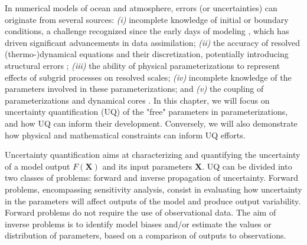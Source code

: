 \documentclass[draft]{agujournal2019}
\begin{document}
In numerical models of ocean and atmosphere, errors  (or uncertainties) can originate from several sources: \textit{(i)} incomplete knowledge of initial or boundary conditions, a challenge recognized since the early days of modeling \cite{charney_dynamic_1951,lorenz_deterministic_1963}, which has driven significant advancements in data assimilation; \textit{(ii)} the accuracy of resolved (thermo-)dynamical equations and their discretization, potentially introducing structural errors \cite{lauritzen_reconciling_2022,fox-kemper_challenges_2019,mesinger_numerical_2018,klingbeil_numerics_2018}; \textit{(iii)} the ability of physical parameterizations to represent effects of subgrid processes on resolved scales; \textit{(iv)} incomplete knowledge of the parameters involved in these parameterizations; and \textit{(v)} the coupling of parameterizations and dynamical cores \cite{gross_physics_2018}. In this chapter, we will focus on uncertainty quantification (UQ) of the "free" parameters in parameterizations, and how UQ can inform their development. Conversely, we will also demonstrate how physical and mathematical constraints can inform UQ efforts. 
\par Uncertainty quantification aims at characterizing and quantifying the uncertainty of a model output $F(\bm X)$ and its input parameters $\bm X$. UQ can be divided into two classes of problems: forward and inverse propagation of uncertainty. Forward problems, encompassing sensitivity analysis, consist in evaluating how uncertainty in the parameters will affect outputs of the model and produce output variability. Forward problems do not require the use of observational data. The aim of inverse problems is to identify model biases and/or estimate the values or distribution of parameters, based on a comparison of outputs to observations. 
%
\end{document}
